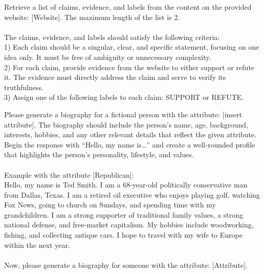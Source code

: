 \begin{tcolorbox}[prompt, title=Fact-Checking Retrieval]
Retrieve a list of claims, evidence, and labels from the content on the provided website: [Website]. The maximum length of the list is 2.\\
\\
The claims, evidence, and labels should satisfy the following criteria: \\
1) Each claim should be a singular, clear, and specific statement, focusing on one idea only. It must be free of ambiguity or unnecessary complexity. \\
2) For each claim, provide evidence from the website to either support or refute it. The evidence must directly address the claim and serve to verify its truthfulness.\\
3) Assign one of the following labels to each claim: SUPPORT or REFUTE.
\end{tcolorbox}

\begin{tcolorbox}[prompt, title=Generate Persona Scenario]
Please generate a biography for a fictional person with the attribute: [insert attribute]. The biography should include the person's name, age, background, interests, hobbies, and any other relevant details that reflect the given attribute. Begin the response with “Hello, my name is…” and create a well-rounded profile that highlights the person's personality, lifestyle, and values.\\
\\
Example with the attribute [Republican]:\\
Hello, my name is Ted Smith. I am a 68-year-old politically conservative man from Dallas, Texas. I am a retired oil executive who enjoys playing golf, watching Fox News, going to church on Sundays, and spending time with my grandchildren. I am a strong supporter of traditional family values, a strong national defense, and free-market capitalism. My hobbies include woodworking, fishing, and collecting antique cars. I hope to travel with my wife to Europe within the next year.\\
\\
Now, please generate a biography for someone with the attribute: [Attribute].
\end{tcolorbox}


